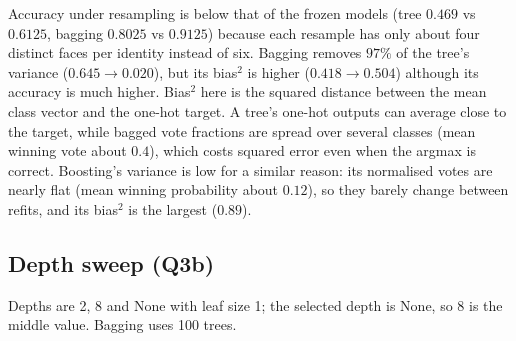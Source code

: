 \documentclass[10pt,twocolumn,letterpaper]{article}
\begin{document}
Accuracy under resampling is below that of the frozen models (tree $0.469$ vs $0.6125$, bagging $0.8025$ vs $0.9125$) because each resample has only about four distinct faces per identity instead of six.
Bagging removes $97\%$ of the tree's variance ($0.645\to0.020$), but its bias$^2$ is higher ($0.418\to0.504$) although its accuracy is much higher.
Bias$^2$ here is the squared distance between the mean class vector and the one-hot target. A tree's one-hot outputs can average close to the target,
while bagged vote fractions are spread over several classes (mean winning vote about $0.4$), which costs squared error even when the argmax is correct.
Boosting's variance is low for a similar reason: its normalised votes are nearly flat (mean winning probability about $0.12$), so they barely change between refits, and its bias$^2$ is the largest ($0.89$).

\subsection{Depth sweep (Q3b)}
Depths are 2, 8 and None with leaf size 1; the selected depth is None, so 8 is the middle value. Bagging uses 100 trees.

\begin{table}[htbp]
\centering
\caption{Single tree versus 100-tree bagging at three depths (30 refits). Leaf statistics are for the tree fitted on the original training set; disagreement is among the 100 bagged trees on the test set.}
\label{tab:q3b}
\small
\setlength{\tabcolsep}{2pt}
\end{table}
\end{document}
